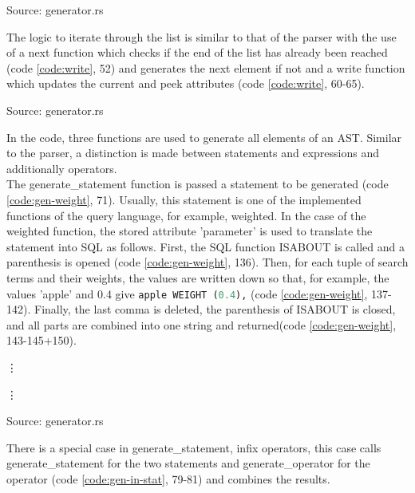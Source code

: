 \begin{codeenv}
    \label{code:gen-struct}
    
    \centerline{Source: generator.rs}
\end{codeenv}
The logic to iterate through the list is similar to that of the parser with the use of a next function which checks if the end of the list has already been reached (code \ref{code:write}, 52) and generates the next element if not and a write function which updates the current and peek attributes (code \ref{code:write}, 60-65).
\begin{codeenv}
    \label{code:write}
    
    \centerline{Source: generator.rs}
\end{codeenv}
In the code, three functions are used to generate all elements of an \ac{AST}. Similar to the parser, a distinction is made between statements and expressions and additionally operators.\\
The generate\_statement function is passed a statement to be generated (code \ref{code:gen-weight}, 71). Usually, this statement is one of the implemented functions of the query language, for example, weighted. In the case of the weighted function, the stored attribute 'parameter' is used to translate the statement into \ac{SQL} as follows. First, the \ac{SQL} function ISABOUT is called and a parenthesis is opened (code \ref{code:gen-weight}, 136). Then, for each tuple of search terms and their weights, the values are written down so that, for example, the values 'apple' and 0.4 give \lstinline[language=SQL]$apple WEIGHT (0.4),$ (code \ref{code:gen-weight}, 137-142). Finally, the last comma is deleted, the parenthesis of ISABOUT is closed, and all parts are combined into one string and returned(code \ref{code:gen-weight}, 143-145+150).
\begin{codeenv}
    \label{code:gen-weight}
    
    \vdots
    
    \vdots
    
    \centerline{Source: generator.rs}
\end{codeenv}
There is a special case in generate\_statement, infix operators, this case calls generate\_statement for the two statements and generate\_operator for the operator (code \ref{code:gen-in-stat}, 79-81) and combines the results.
